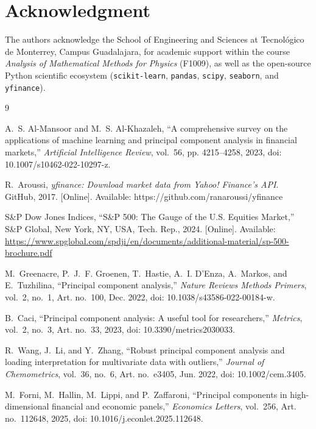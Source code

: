 \documentclass[eng]{ajceam-class}
\begin{document}
\section*{Acknowledgment}
The authors acknowledge the School of Engineering and Sciences at Tecnológico de Monterrey, Campus Guadalajara, for academic support within the course \textit{Analysis of Mathematical Methods for Physics} (F1009), as well as the open-source Python scientific ecosystem (\texttt{scikit-learn}, \texttt{pandas}, \texttt{scipy}, \texttt{seaborn}, and \texttt{yfinance}).

\begin{thebibliography}{9}

A.~S. Al-Mansoor and M.~S. Al-Khazaleh, ``A comprehensive survey on the applications of machine learning and principal component analysis in financial markets,'' \textit{Artificial Intelligence Review}, vol.~56, pp. 4215--4258, 2023, doi: 10.1007/s10462-022-10297-z.

R.~Aroussi, \textit{yfinance: Download market data from Yahoo! Finance's API}. GitHub, 2017. [Online]. Available: https://github.com/ranaroussi/yfinance

S\&P Dow Jones Indices, ``S\&P 500: The Gauge of the U.S. Equities Market,'' S\&P Global, New York, NY, USA, Tech. Rep., 2024. [Online]. Available: \url{https://www.spglobal.com/spdji/en/documents/additional-material/sp-500-brochure.pdf}

M.~Greenacre, P.~J.~F. Groenen, T.~Hastie, A.~I. D'Enza, A.~Markos, and E.~Tuzhilina, ``Principal component analysis,'' \textit{Nature Reviews Methods Primers}, vol.~2, no.~1, Art. no.~100, Dec. 2022, doi: 10.1038/s43586-022-00184-w.

B.~Caci, ``Principal component analysis: A useful tool for researchers,'' \textit{Metrics}, vol.~2, no.~3, Art. no.~33, 2023, doi: 10.3390/metrics2030033.

R.~Wang, J.~Li, and Y.~Zhang, ``Robust principal component analysis and loading interpretation for multivariate data with outliers,'' \textit{Journal of Chemometrics}, vol.~36, no.~6, Art. no.~e3405, Jun. 2022, doi: 10.1002/cem.3405.

M.~Forni, M.~Hallin, M.~Lippi, and P.~Zaffaroni, ``Principal components in high-dimensional financial and economic panels,'' \textit{Economics Letters}, vol.~256, Art. no.~112648, 2025, doi: 10.1016/j.econlet.2025.112648.


\end{thebibliography}
\end{document}
